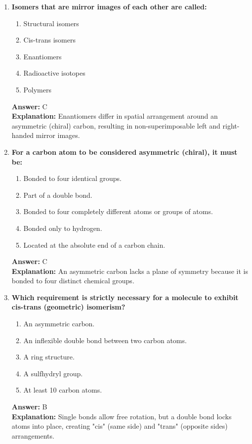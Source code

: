 \documentclass[11pt, a4paper]{article}
\begin{document}
\begin{enumerate}
\item \textbf{Isomers that are mirror images of each other are called:}
\begin{enumerate}[label=\Alph*.]
    \item Structural isomers
    \item Cis-trans isomers
    \item Enantiomers
    \item Radioactive isotopes
    \item Polymers
\end{enumerate}
\textbf{Answer:} C \\
\textbf{Explanation:} Enantiomers differ in spatial arrangement around an asymmetric (chiral) carbon, resulting in non-superimposable left and right-handed mirror images.

\item \textbf{For a carbon atom to be considered asymmetric (chiral), it must be:}
\begin{enumerate}[label=\Alph*.]
    \item Bonded to four identical groups.
    \item Part of a double bond.
    \item Bonded to four completely different atoms or groups of atoms.
    \item Bonded only to hydrogen.
    \item Located at the absolute end of a carbon chain.
\end{enumerate}
\textbf{Answer:} C \\
\textbf{Explanation:} An asymmetric carbon lacks a plane of symmetry because it is bonded to four distinct chemical groups.

\item \textbf{Which requirement is strictly necessary for a molecule to exhibit cis-trans (geometric) isomerism?}
\begin{enumerate}[label=\Alph*.]
    \item An asymmetric carbon.
    \item An inflexible double bond between two carbon atoms.
    \item A ring structure.
    \item A sulfhydryl group.
    \item At least 10 carbon atoms.
\end{enumerate}
\textbf{Answer:} B \\
\textbf{Explanation:} Single bonds allow free rotation, but a double bond locks atoms into place, creating "cis" (same side) and "trans" (opposite sides) arrangements.


\end{enumerate}
\end{document}
